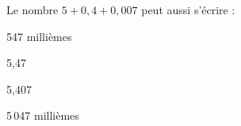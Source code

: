 \begin{QCM}
\begin{GroupeQCM}
    \begin{exercice}
      Le nombre $5 + 0,4 + 0,007$ peut aussi s'écrire :
      \begin{ChoixQCM}{4}
      \item 547 millièmes
      \item 5,47
      \item 5,407
      \item 5\,047 millièmes
      \end{ChoixQCM}
      \begin{corrige}
   \end{corrige}
    \end{exercice}
 \end{GroupeQCM}  
\end{QCM}  
    
    
    
    
    
